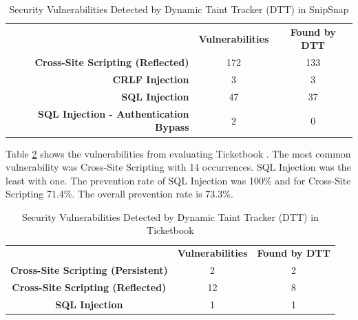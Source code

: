 \begin{table}[!hbt]
  \centering
  \caption{Security Vulnerabilities Detected by Dynamic Taint Tracker (DTT) in SnipSnap}
  \label{table:SnipSnapTable}
  \begin{tabular}{rcc}
    & \textbf{Vulnerabilities} & \textbf{Found by DTT} \\
    \textbf{Cross-Site Scripting (Reflected)}      & 172           & 133  \\
    \textbf{CRLF Injection}                        & 3             & 3    \\
    \textbf{SQL Injection}                         & 47            & 37   \\
    \textbf{SQL Injection - Authentication Bypass} & 2             & 0       
  \end{tabular}
\end{table}

Table \ref{table:Ticketbook} shows the vulnerabilities from evaluating Ticketbook \parencite{ticketbook}. The most common vulnerability was Cross-Site Scripting with 14 occurrences. SQL Injection was the least with one. The prevention rate of SQL Injection was 100\% and for Cross-Site Scripting 71.4\%. The overall prevention rate is 73.3\%.

\begin{table}[!hbt]
  \centering
  \caption{Security Vulnerabilities Detected by Dynamic Taint Tracker (DTT) in Ticketbook}
  \label{table:Ticketbook}
  \begin{tabular}{ccc}
    & \textbf{Vulnerabilities} & \textbf{Found by DTT} \\
    \textbf{Cross-Site Scripting (Persistent)} & 2             & 2 \\
    \textbf{Cross-Site Scripting (Reflected)}  & 12            & 8 \\
    \textbf{SQL Injection}                     & 1             & 1
  \end{tabular}
\end{table}